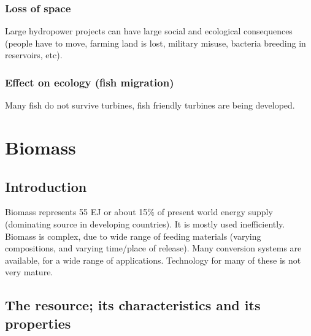 \documentclass[a4paper,10pt]{article}
\begin{document}
\subsubsection{Loss of space}
Large hydropower projects can have large social and ecological consequences (people have to move, farming land is lost, military misuse, bacteria breeding in reservoirs, etc).

\subsubsection{Effect on ecology (fish migration)}
Many fish do not survive turbines, fish friendly turbines are being developed.


\section{Biomass}

\subsection{Introduction}
Biomass represents 55 EJ or about 15\% of present world energy supply (dominating source in developing countries). It is mostly used inefficiently. Biomass is complex, due to wide range of feeding materials (varying compositions, and varying time/place of release). Many conversion systems are available, for a wide range of applications. Technology for many of these is not very mature.

\subsection{The resource; its characteristics and its properties}
\end{document}

